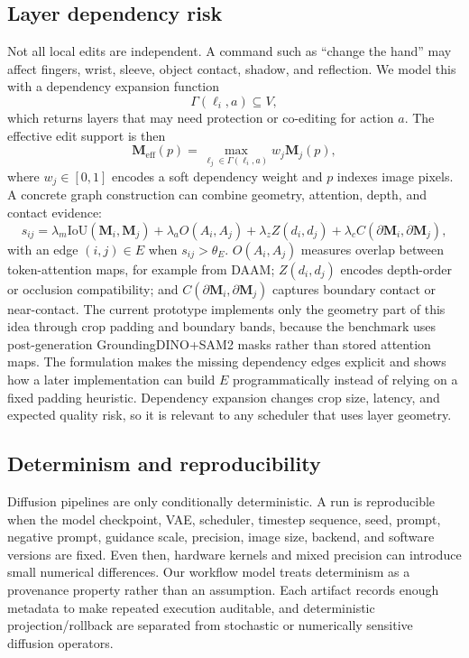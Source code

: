 \documentclass[final,5p,times,number,sort&compress]{elsarticle}
\newcommand{\mask}{\mathbf{M}}
\begin{document}
\subsection{Layer dependency risk}

Not all local edits are independent. A command such as ``change the hand'' may affect fingers, wrist, sleeve, object contact, shadow, and reflection. We model this with a dependency expansion function
\begin{equation}
    \Gamma(\ell_i, a) \subseteq V,
\end{equation}
which returns layers that may need protection or co-editing for action \(a\). The effective edit support is then
\begin{equation}
    \mask_{\mathrm{eff}}(p) =
    \max_{\ell_j \in \Gamma(\ell_i,a)} w_j \mask_j(p),
\end{equation}
where \(w_j \in [0,1]\) encodes a soft dependency weight and \(p\) indexes image pixels. A concrete graph construction can combine geometry, attention, depth, and contact evidence:
\begin{equation}
    s_{ij} =
    \lambda_m \mathrm{IoU}(\mask_i,\mask_j)
    + \lambda_a O(A_i,A_j)
    + \lambda_z Z(d_i,d_j)
    + \lambda_c C(\partial \mask_i,\partial \mask_j),
\end{equation}
with an edge \((i,j)\in E\) when \(s_{ij}>\theta_E\). \(O(A_i,A_j)\) measures overlap between token-attention maps, for example from DAAM; \(Z(d_i,d_j)\) encodes depth-order or occlusion compatibility; and \(C(\partial \mask_i,\partial \mask_j)\) captures boundary contact or near-contact. The current prototype implements only the geometry part of this idea through crop padding and boundary bands, because the benchmark uses post-generation GroundingDINO+SAM2 masks rather than stored attention maps. The formulation makes the missing dependency edges explicit and shows how a later implementation can build \(E\) programmatically instead of relying on a fixed padding heuristic. Dependency expansion changes crop size, latency, and expected quality risk, so it is relevant to any scheduler that uses layer geometry.

\subsection{Determinism and reproducibility}

Diffusion pipelines are only conditionally deterministic. A run is reproducible when the model checkpoint, VAE, scheduler, timestep sequence, seed, prompt, negative prompt, guidance scale, precision, image size, backend, and software versions are fixed. Even then, hardware kernels and mixed precision can introduce small numerical differences. Our workflow model treats determinism as a provenance property rather than an assumption. Each artifact records enough metadata to make repeated execution auditable, and deterministic projection/rollback are separated from stochastic or numerically sensitive diffusion operators.
\end{document}
